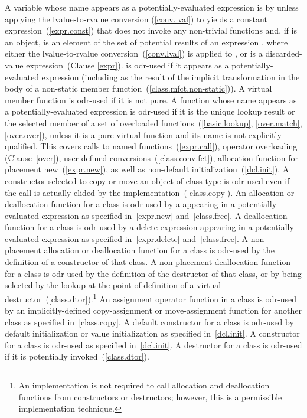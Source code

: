\pnum
A variable  whose name appears as a
potentially-evaluated expression  is  by  unless
applying the lvalue-to-rvalue conversion (\ref{conv.lval}) to  yields
a constant expression~(\ref{expr.const}) that does not invoke any non-trivial
functions
and, if  is an object,  is an element of
the set of potential results of an expression , where either the lvalue-to-rvalue
conversion~(\ref{conv.lval}) is applied to , or  is
a discarded-value expression~(Clause \ref{expr}).
 is odr-used if it appears as a potentially-evaluated expression
(including as the result of the implicit transformation in the body of a non-static
member function~(\ref{class.mfct.non-static})).
A virtual member
function is odr-used if it is not pure.
A function whose name appears as a potentially-evaluated
expression is odr-used if it is the unique lookup result or the selected
member of a set of overloaded functions~(\ref{basic.lookup}, \ref{over.match}, \ref{over.over}), unless it is a pure virtual
function and its name is not explicitly qualified.
\enternote This covers calls to named
functions~(\ref{expr.call}), operator overloading (Clause~\ref{over}),
user-defined conversions~(\ref{class.conv.fct}), allocation function for
placement new~(\ref{expr.new}), as well as non-default
initialization~(\ref{dcl.init}). A constructor selected to copy or move an
object of class type is odr-used even if the
call is actually elided by the implementation~(\ref{class.copy}). \exitnote An allocation
or deallocation function for a class is odr-used by a 
appearing in a potentially-evaluated expression as specified
in~\ref{expr.new} and~\ref{class.free}. A deallocation function for a
class is odr-used by a delete expression appearing in a
potentially-evaluated expression as specified in~\ref{expr.delete}
and~\ref{class.free}. A non-placement allocation or deallocation
function for a class is odr-used by the definition of a constructor of that
class. A non-placement deallocation function for a class is odr-used by the
definition of the destructor of that class, or by being selected by the
lookup at the point of definition of a virtual
destructor~(\ref{class.dtor}).\footnote{An implementation is not required
to call allocation and
deallocation functions from constructors or destructors; however, this
is a permissible implementation technique.}
An assignment operator function in a class is odr-used by an
implicitly-defined
copy-assignment or move-assignment function for another class as specified
in~\ref{class.copy}.
A default constructor for a class is odr-used by
default initialization or value initialization as specified
in~\ref{dcl.init}. A constructor for a class is odr-used as specified
in~\ref{dcl.init}. A destructor for a class is odr-used if it is potentially
invoked~(\ref{class.dtor}).

